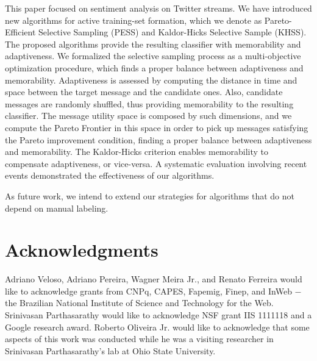 \documentclass{sig-alternate}
\begin{document}
This paper focused on sentiment analysis on Twitter streams. We have introduced new algorithms for active training-set formation, which we denote as Pareto-Efficient Selective Sampling (PESS) and Kaldor-Hicks Selective Sample (KHSS). The proposed algorithms provide the resulting classifier with memorability and adaptiveness. We formalized the selective sampling process as a multi-objective optimization procedure, which finds a proper balance between adaptiveness and memorability.
Adaptiveness is assessed by computing the distance in time and space between the target message and the candidate ones. Also, candidate messages are randomly shuffled, thus providing memorability to the resulting classifier. The message utility space is composed by such dimensions, and we compute the Pareto Frontier in this space in order to pick up messages satisfying the Pareto improvement condition, finding a proper balance between adaptiveness and memorability. The Kaldor-Hicks criterion enables memorability to compensate adaptiveness, or vice-versa. A systematic evaluation involving recent events demonstrated the effectiveness of our algorithms.

As future work, we intend to extend our strategies for algorithms that do not depend on manual labeling.

\section{Acknowledgments}

Adriano Veloso, Adriano Pereira, Wagner Meira Jr., and Renato Ferreira would like to acknowledge grants from CNPq, CAPES, Fapemig, Finep, and InWeb $-$ the Brazilian National Institute of Science and Technology for the Web.
Srinivasan Parthasarathy would like to acknowledge NSF grant IIS 1111118 and a Google research award. Roberto Oliveira Jr. would like to acknowledge that some aspects of this work was conducted while he was a visiting researcher in Srinivasan Parthasarathy's lab at Ohio State University.

\balance
\end{document}
